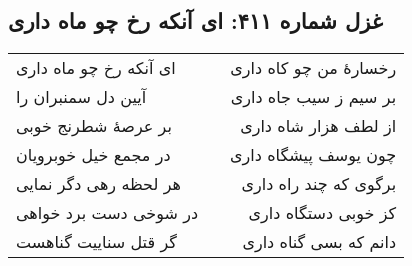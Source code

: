 \begin{center}
\section*{غزل شماره ۴۱۱: ای آنکه رخ چو ماه داری}
\label{sec:411}
\begin{longtable}{l p{0.5cm} r}
ای آنکه رخ چو ماه داری
&&
رخسارهٔ من چو کاه داری
\\
آیین دل سمنبران را
&&
بر سیم ز سیب جاه داری
\\
بر عرصهٔ شطرنج خوبی
&&
از لطف هزار شاه داری
\\
در مجمع خیل خوبرویان
&&
چون یوسف پیشگاه داری
\\
هر لحظه رهی دگر نمایی
&&
برگوی که چند راه داری
\\
در شوخی دست برد خواهی
&&
کز خوبی دستگاه داری
\\
گر قتل سناییت گناهست
&&
دانم که بسی گناه داری
\\
\end{longtable}
\end{center}
